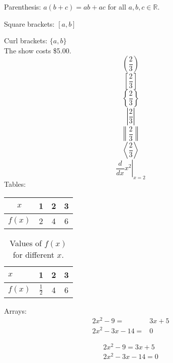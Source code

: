 \documentclass[]{article}
\begin{document}
Parenthesis: $a(b+c)=ab+ac$ for all $a,b,c \in \mathbb{R}$.

Square brackets: $[a,b]$ 

Curl brackets: $\{a,b\}$ \\[6pt]
The show costs \$5.00. \\[6pt]
$$\left(\frac{2}{3}\right)$$
$$\left[\frac{2}{3}\right]$$
$$\left\{\frac{2}{3}\right\}$$
$$\left|\frac{2}{3}\right|$$
$$\left\|\frac{2}{3}\right\|$$
$$\left\langle\frac{2}{3}\right\rangle$$
$$\left.\frac{d}{dx}x^2\right|_{x=2}$$
\vspace{1cm}
Tables:\\[6pt]

\begin{tabular}{|c|c|c|c|}
    \hline
    $x$ & 1 & 2 & 3 \\
    \hline
    $f(x)$ & 2 & 4 & 6 \\
    \hline
\end{tabular}

\vspace{1cm}

\begin{table}[H]
    \centering
    \caption{Values of $f(x)$ for different $x$.}
    \def\arraystretch{1.5}
\begin{tabular}{|p{1cm}|c|c|c|}
    \hline
    $x$ & 1 & 2 & 3 \\
    \hline
    $f(x)$ & $\frac{1}{2}$ & 4 & 6 \\
    \hline
\end{tabular}
\end{table}

\vspace{1cm}
Arrays:\\[6pt]

\begin{align}
    2x^2-9=&3x+5\\
    2x^2-3x-14=&0
\end{align}

\begin{align*} %
    2x^2-9=3x+5\\
    2x^2-3x-14=0
\end{align*}
\end{document}
